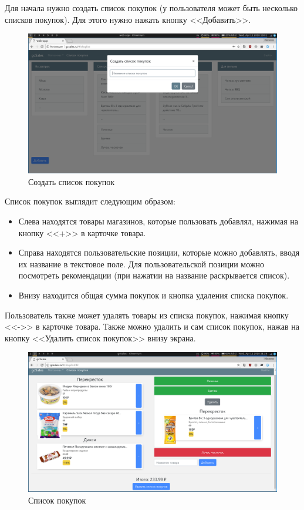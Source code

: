 Для начала нужно создать список покупок (у пользователя может быть несколько
списков покупок). Для этого нужно нажать кнопку <<Добавить>>.
\begin{figure}[H]
    \centering
    \includegraphics[width=\textwidth]{./screenshots/create_shoplist.png}
    \caption{Создать список покупок}
\end{figure}

Список покупок выглядит следующим образом: 
\begin{itemize}
  \item Слева находятся товары магазинов, которые пользовать добавлял, нажимая
    на кнопку <<+>> в карточке товара.
  \item Справа находятся пользовательские позиции, которые можно добавлять,
    вводя их название в текстовое поле. Для пользовательской позиции можно
    посмотреть рекомендации (при нажатии на название раскрывается список).
  \item Внизу находится общая сумма покупок и кнопка удаления списка покупок.
\end{itemize}

Пользователь также может удалять товары из списка покупок, нажимая кнопку <<->>
в карточке товара. Также можно удалить и сам список покупок, нажав на кнопку
<<Удалить список покупок>> внизу экрана.

\begin{figure}[H]
    \centering
    \includegraphics[width=\textwidth]{./screenshots/shoplist.png}
    \caption{Список покупок}
\end{figure}

